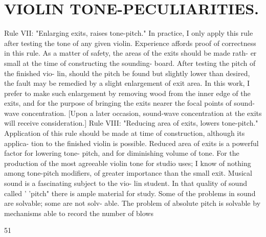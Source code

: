 \documentclass{article}
\begin{document}
\section*{VIOLIN TONE-PECULIARITIES.}
Rule VII: "Enlarging exits, raises tone-pitch." In practice, I only apply this rule after testing the tone of any given violin. Experience affords proof of correctness in this rule. As a matter of safety, the areas of the exits should be made rath- er small at the time of constructing the sounding- board. After testing the pitch of the finished vio- lin, should the pitch be found but slightly lower than desired, the fault may be remedied by a slight enlargement of exit area. In this work, I prefer to make such enlargement by removing wood from the inner edge of the exits, and for the purpose of bringing the exits nearer the focal points of sound-wave concentration. [Upon a later occasion, sound-wave concentration at the exits will receive consideration.] Rule VIII: "Reducing area of exits, lowers tone-pitch." Application of this rule should be made at time of construction, although its applica- tion to the finished violin is possible. Reduced area of exits is a powerful factor for lowering tone- pitch, and for diminishing volume of tone. For the production of the most agreeable violin tone for studio uses; I know of nothing among tone-pitch modifiers, of greater importance than the small exit. Musical sound is a fascinating subject to the vio- lin student. In that quality of sound called ' 'pitch" there is ample material for study. Some of the problems in sound are solvable; some are not solv- able. The problem of absolute pitch is solvable by mechanisms able to record the number of blows

51
\end{document}
